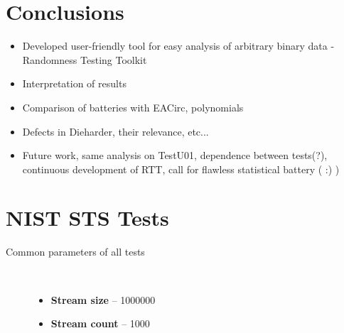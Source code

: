 \documentclass[
  digital,  	%
  color,		%
  oneside,   	%
  12pt,
  nocover,
  notable,
  nolof,
  nolot,
]{fithesis3}
\newenvironment{titlemize}[1]
{
	\begin{description}
	\item[#1]\
	\begin{itemize}
}
{
	\end{itemize}
 	\end{description}
}
\theoremstyle{definition}
\theoremstyle{remark}
\begin{document}
\chapter{Conclusions}
\begin{itemize}
\item Developed user-friendly tool for easy analysis of arbitrary binary data - Randomness Testing Toolkit
\item Interpretation of results
\item Comparison of batteries with EACirc, polynomials
\item Defects in Dieharder, their relevance, etc...
\item Future work, same analysis on TestU01, dependence between tests(?), continuous development of RTT, call for flawless statistical battery ( :) )
\end{itemize}

\appendix

\printbibliography

\chapter{NIST STS Tests}
\label{app:nist_sts_tests}

\begin{titlemize}{Common parameters of all tests}
\item \textbf{Stream size} -- 1000000
\item \textbf{Stream count} -- 1000
\end{titlemize}
\end{document}
